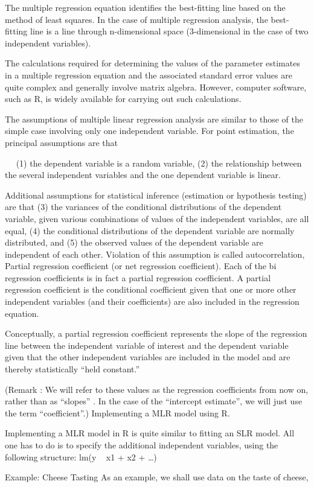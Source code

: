 
The multiple regression equation identifies the best-fitting line based on the method of least squares. In the case of multiple regression analysis, the best-fitting line is a line through
n-dimensional space (3-dimensional in the case of two independent variables). 

The calculations required for determining the values of the parameter estimates in a multiple regression equation and the associated standard error values are quite complex and generally involve matrix algebra. However, computer software, such as R, is widely available for carrying out such calculations.

The assumptions of multiple linear regression analysis are similar to those of the simple case involving only one independent variable. For point estimation, the principal assumptions are that
  
 
(1) the dependent variable is a random variable,
(2) the relationship between the several independent variables and the one dependent variable is linear.

Additional assumptions for statistical inference (estimation or hypothesis testing) are that 
(3) the variances of the conditional distributions of the dependent variable, given various combinations of values of the independent variables, are all equal, 
(4) the conditional distributions of the dependent variable
are normally distributed, and 
(5) the observed values of the dependent variable are independent of each other. Violation of this assumption is called autocorrelation,
Partial regression coefficient (or net regression coefficient). Each of the bi regression coefficients is in fact a partial regression coefficient. A partial regression coefficient is the conditional coefficient given that one or more other independent variables (and their coefficients) are also included in the regression equation. 

Conceptually, a partial regression coefficient represents the slope of the regression line between the independent variable of interest and the dependent variable given that the other independent variables are included in the model and are thereby statistically “held constant.”

(Remark : We will refer to these values as the regression coefficients from now on, rather than as “slopes” . In the case of the “intercept estimate”, we will just use the term “coefficient”.)
Implementing a MLR model using R.

Implementing a MLR model in R is quite similar to fitting an SLR model.
All one has to do is to specify the additional independent variables, using the following structure:
lm(y ~ x1 + x2 + …)



Example: Cheese Tasting
As an example, we shall use data on the taste of cheese, 